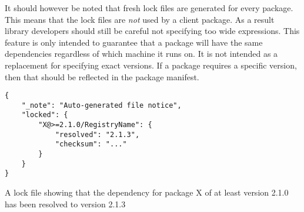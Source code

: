 It should however be noted that fresh lock files are generated for every
package. This means that the lock files are \emph{not} used by a client
package. As a result library developers should still be careful not specifying
too wide expressions. This feature is only intended to guarantee that a package
will have the same dependencies regardless of which machine it runs on. It is
not intended as a replacement for specifying exact versions. If a package
requires a specific version, then that should be reflected in the package
manifest.

\begin{listing}[H]
\begin{verbatim}
{
    "_note": "Auto-generated file notice",
    "locked": {
        "X@>=2.1.0/RegistryName": {
            "resolved": "2.1.3",
            "checksum": "..."
        }
    }
}
\end{verbatim}

\caption{A lock file showing that the dependency for package X of at least
    version 2.1.0 has been resolved to version 2.1.3}

\label{lst:lock_file}
\end{listing}

